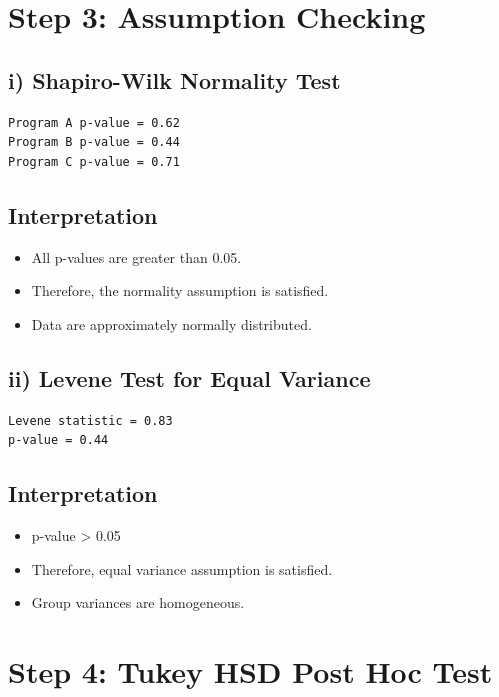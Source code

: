 \documentclass[12pt]{article}
\begin{document}
\section*{Step 3: Assumption Checking}

\subsection*{i) Shapiro-Wilk Normality Test}

\begin{verbatim}
Program A p-value = 0.62
Program B p-value = 0.44
Program C p-value = 0.71
\end{verbatim}

\subsection*{Interpretation}

\begin{itemize}
    \item All p-values are greater than 0.05.
    \item Therefore, the normality assumption is satisfied.
    \item Data are approximately normally distributed.
\end{itemize}

\subsection*{ii) Levene Test for Equal Variance}

\begin{verbatim}
Levene statistic = 0.83
p-value = 0.44
\end{verbatim}

\subsection*{Interpretation}

\begin{itemize}
    \item p-value > 0.05
    \item Therefore, equal variance assumption is satisfied.
    \item Group variances are homogeneous.
\end{itemize}

\section*{Step 4: Tukey HSD Post Hoc Test}
\end{document}
